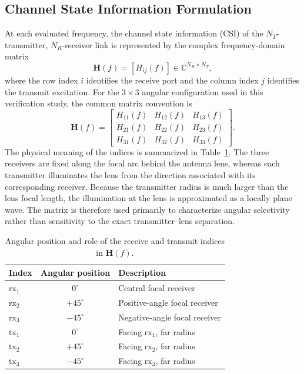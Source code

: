 \subsection{Channel State Information Formulation}
\label{subsec:csi_formulation}
At each evaluated frequency, the channel state information (CSI) of the $N_T$-transmitter, $N_R$-receiver link is represented by the complex frequency-domain matrix
\begin{equation}
    \mathbf{H}(f)=\left[H_{ij}(f)\right]
    \in \mathbb{C}^{N_R\times N_T},
    \label{eq:csi_matrix_general}
\end{equation}
where the row index $i$ identifies the receive port and the column index $j$ identifies the transmit excitation. For the $3\times3$ angular configuration used in this verification study, the common matrix convention is
\begin{equation}
    \mathbf{H}(f)=
    \begin{bmatrix}
        H_{11}(f) & H_{12}(f) & H_{13}(f) \\
        H_{21}(f) & H_{22}(f) & H_{23}(f) \\
        H_{31}(f) & H_{32}(f) & H_{33}(f)
    \end{bmatrix}.
    \label{eq:csi_matrix_3x3}
\end{equation}
The physical meaning of the indices is summarized in Table~\ref{tab:sparam_index_mapping}. The three receivers are fixed along the focal arc behind the antenna lens, whereas each transmitter illuminates the lens from the direction associated with its corresponding receiver. Because the transmitter radius is much larger than the lens focal length, the illumination at the lens is approximated as a locally plane wave. The matrix is therefore used primarily to characterize angular selectivity rather than sensitivity to the exact transmitter--lens separation.

\begin{table}[h!]
    \centering
    \caption{Angular position and role of the receive and transmit indices in $\mathbf{H}(f)$.}
    \label{tab:sparam_index_mapping}
    \begin{tabular}{|l|c|l|}
        \hline
        \textbf{Index} & \textbf{Angular position} & \textbf{Description} \\
        \hline
        $\mathrm{rx}_1$ & $0^\circ$ & Central focal receiver \\
        $\mathrm{rx}_2$ & $+45^\circ$ & Positive-angle focal receiver \\
        $\mathrm{rx}_3$ & $-45^\circ$ & Negative-angle focal receiver \\
        \hline
        $\mathrm{tx}_1$ & $0^\circ$ & Facing $\mathrm{rx}_1$, far radius \\
        $\mathrm{tx}_2$ & $+45^\circ$ & Facing $\mathrm{rx}_2$, far radius \\
        $\mathrm{tx}_3$ & $-45^\circ$ & Facing $\mathrm{rx}_3$, far radius \\
        \hline
    \end{tabular}
\end{table}

